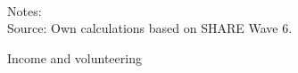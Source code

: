 \documentclass[10pt, letterpaper]{article}
\begin{document}
\begin{spacing}{1.4}
\begin{spacing}{.9}
\begin{spacing}{.9}
\centering 
\begin{scriptsize} 
	 
      \label{StatHealth} 
\end{scriptsize}
\end{spacing}


\begin{figure}[H]
\centering
\caption{Income and volunteering} 
\label{fig:casp_ols}
\begin{minipage}{1\linewidth}
\quad
{}~\\ 
{\footnotesize Notes: }~\\
{\footnotesize Source: Own calculations based on SHARE Wave 6.}
\end{minipage}
\end{figure} 


%	 


\end{spacing}
\end{spacing}
\end{document}
